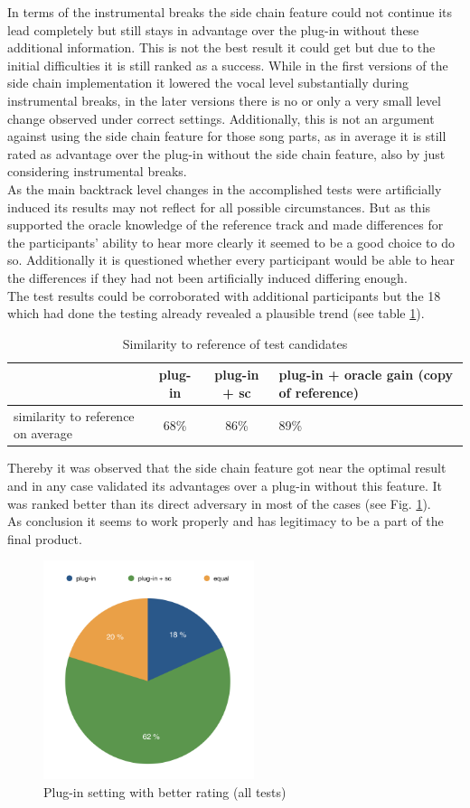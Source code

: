 In terms of the instrumental breaks the side chain feature could not continue its lead completely but still stays in advantage over the plug-in without these additional information. This is not the best result it could get but due to the initial difficulties it is still ranked as a success. While in the first versions of the side chain implementation it lowered the vocal level substantially during instrumental breaks, in the later versions there is no or only a very small level change observed under correct settings. Additionally, this is not an argument against using the side chain feature for those song parts, as in average it is still rated as advantage over the plug-in without the side chain feature, also by just considering instrumental breaks.\\
As the main backtrack level changes in the accomplished tests were artificially induced its results may not reflect for all possible circumstances. But as this supported the oracle knowledge of the reference track and made differences for the participants' ability to hear more clearly it seemed to be a good choice to do so. Additionally it is questioned whether every participant would be able to hear the differences if they had not been artificially induced differing enough.\\
The test results could be corroborated with additional participants but the 18 which had done the testing already revealed a plausible trend (see table \ref{t2}).\\

\begin{table}[H]
	\centering
	\begin{tabular}{ p{4cm} | c | c | p{4cm} }
		& plug-in & plug-in + sc & plug-in + oracle gain (copy of reference) \\ \hline
		similarity to reference on average & 68\% & 86\% & 89\% \\
	\end{tabular}
	\caption{Similarity to reference of test candidates}
	\label{t2}
\end{table}

Thereby it was observed that the side chain feature got near the optimal result and in any case validated its advantages over a plug-in without this feature. It was ranked better than its direct adversary in most of the cases (see Fig. \ref{b1}).\\
As conclusion it seems to work properly and has legitimacy to be a part of the final product.\\

\begin{figure}[H]
\includegraphics[width=0.55\textwidth]{images/betterRating}
	\centering
	\caption{Plug-in setting with better rating (all tests)}
	\label{b1}
\end{figure}
